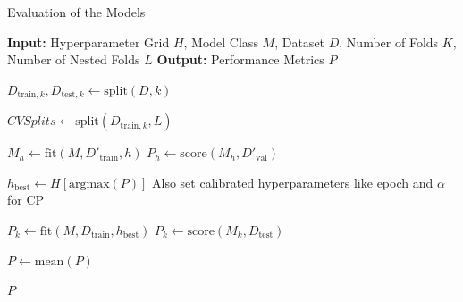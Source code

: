 \begin{algorithm}
    \caption{Evaluation of the Models}
    \label{alg:evaluation}
    \begin{algorithmic}
        \STATE \textbf{Input:} Hyperparameter Grid $H$, Model Class $M$, Dataset $D$, Number of Folds $K$, Number of Nested Folds $L$
        \STATE \textbf{Output:} Performance Metrics $P$

        \STATE $D_{\text{train}, k}, D_{\text{test}, k} \leftarrow \text{split}(D, k)$

        \STATE $CVSplits \leftarrow \text{split}(D_{\text{train}, k}, L)$

        \STATE $M_h \leftarrow \text{fit}(M, D'_{\text{train}}, h)$
        \STATE $P_h \leftarrow \text{score}(M_h, D'_{\text{val}})$
        \ENDFOR
        \ENDFOR

        \STATE $h_{\text{best}} \leftarrow H[\text{argmax}(P)]$ Also set calibrated hyperparameters like epoch and $\alpha$ for CP

        \STATE $P_k \leftarrow \text{fit}(M, D_{\text{train}}, h_{\text{best}})$
        \STATE $P_k \leftarrow \text{score}(M_k, D_{\text{test}})$
        \ENDFOR

        \STATE $P \leftarrow \text{mean}(P)$

        \RETURN $P$
    \end{algorithmic}
\end{algorithm}

